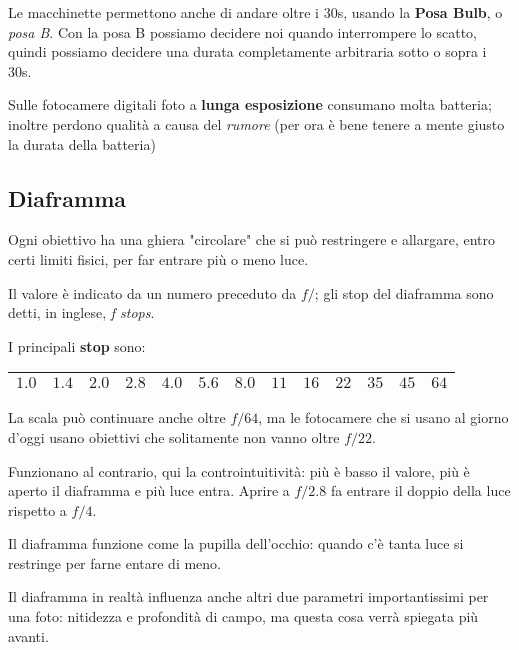 Le macchinette permettono anche di andare oltre i 30s, usando la \textbf{Posa Bulb}, o \textit{posa B}.
Con la posa B possiamo decidere noi quando interrompere lo scatto, quindi possiamo decidere una durata completamente arbitraria sotto o sopra i 30s.

\nb Sulle fotocamere digitali foto a \textbf{lunga esposizione} consumano molta batteria; inoltre perdono qualità a causa del \textit{rumore} (per ora è bene tenere a mente giusto la durata della batteria)


\subsection{Diaframma} \label{subsec:diaframma}
Ogni obiettivo ha una ghiera "circolare" che si può restringere e allargare, entro certi
limiti fisici, per far entrare più o meno luce.

Il valore è indicato da un numero preceduto da $f/$; gli stop del diaframma sono detti, in inglese, \textit{f stops}.

I principali \textbf{stop} sono:
\begin{table}[h]
    \centering
    \begin{tabular}{|l|l|l|l|l|l|l|l|l|l|l|l|l|}
        \hline
        $1.0$ & $1.4$ & $2.0$ & $2.8$ & $4.0$ & $5.6$ & $8.0$ & $11$ & $16$ & $22$ & $35$ & $45$ & $64$\\
        \hline
    \end{tabular}
\end{table}

\nb La scala può continuare anche oltre $f/64$, ma le fotocamere che si usano al giorno d'oggi usano obiettivi che solitamente non vanno oltre $f/22$.

Funzionano al contrario, qui la controintuitività: più è basso il valore, più è aperto il
diaframma e più luce entra.\newline
Aprire a $f/2.8$ fa entrare il doppio della luce rispetto a $f/4$.

Il diaframma funzione come la pupilla dell'occhio: quando c'è tanta luce si restringe per farne entare di meno.

Il diaframma in realtà influenza anche altri due parametri importantissimi per una foto:
nitidezza e profondità di campo, ma questa cosa verrà spiegata più avanti.




